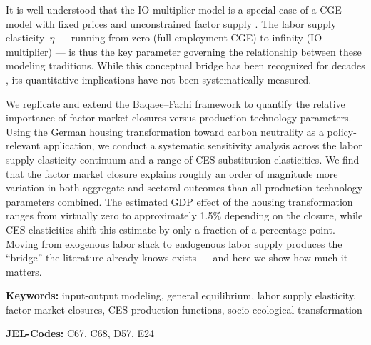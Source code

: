 It is well understood that the IO multiplier model is a special case of a CGE model with fixed prices and unconstrained factor supply \citep{Robinson.2006}. The labor supply elasticity~$\eta$ --- running from zero (full-employment CGE) to infinity (IO multiplier) --- is thus the key parameter governing the relationship between these modeling traditions. While this conceptual bridge has been recognized for decades \citep{Rose.1995,Dervis.1982}, its quantitative implications have not been systematically measured.


We replicate and extend the Baqaee--Farhi framework to quantify the relative importance of factor market closures versus production technology parameters. Using the German housing transformation toward carbon neutrality as a policy-relevant application, we conduct a systematic sensitivity analysis across the labor supply elasticity continuum and a range of CES substitution elasticities. We find that the factor market closure explains roughly an order of magnitude more variation in both aggregate and sectoral outcomes than all production technology parameters combined. The estimated GDP effect of the housing transformation ranges from virtually zero to approximately 1.5\% depending on the closure, while CES elasticities shift this estimate by only a fraction of a percentage point. Moving from exogenous labor slack to endogenous labor supply produces the ``bridge'' the literature already knows exists --- and here we show how much it matters.


\textbf{Keywords:} input-output modeling, general equilibrium, labor supply elasticity, factor market closures, CES production functions, socio-ecological transformation

\textbf{JEL-Codes:} C67, C68, D57, E24




